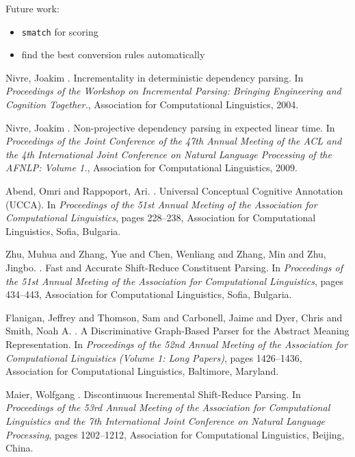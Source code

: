 \documentclass[11pt]{article}
\begin{document}
Future work:
\begin{itemize}
\item \texttt{smatch} for scoring
\item find the best conversion rules automatically
\end{itemize}

\begin{thebibliography}{}
	
	Nivre, Joakim
	.
	\newblock Incrementality in deterministic dependency parsing.
	\newblock In {\em Proceedings of the Workshop on Incremental Parsing: Bringing Engineering and Cognition Together.}, Association for Computational Linguistics, 2004.
		
	Nivre, Joakim
	.
	\newblock Non-projective dependency parsing in expected linear time.
	\newblock In {\em Proceedings of the Joint Conference of the 47th Annual Meeting of the ACL and the 4th International Joint Conference on Natural Language Processing of the AFNLP: Volume 1.}, Association for Computational Linguistics, 2009.
	
	Abend, Omri  and  Rappoport, Ari.
	.
	\newblock Universal Conceptual Cognitive Annotation (UCCA).
	\newblock In {\em Proceedings of the 51st Annual Meeting of the Association for Computational Linguistics}, pages 228--238, Association for Computational Linguistics, Sofia, Bulgaria.
	
	Zhu, Muhua  and  Zhang, Yue  and  Chen, Wenliang  and  Zhang, Min  and  Zhu, Jingbo.
	.
	\newblock Fast and Accurate Shift-Reduce Constituent Parsing.
	\newblock In {\em Proceedings of the 51st Annual Meeting of the Association for Computational Linguistics}, pages 434--443, Association for Computational Linguistics, Sofia, Bulgaria.
	
	Flanigan, Jeffrey  and  Thomson, Sam  and  Carbonell, Jaime  and  Dyer, Chris  and  Smith, Noah A.
	.
	\newblock A Discriminative Graph-Based Parser for the Abstract Meaning Representation.
	\newblock In {\em Proceedings of the 52nd Annual Meeting of the Association for Computational Linguistics (Volume 1: Long Papers)}, pages 1426--1436, Association for Computational Linguistics, Baltimore, Maryland.
		
	Maier, Wolfgang
	.
	\newblock Discontinuous Incremental Shift-Reduce Parsing.
	\newblock In {\em Proceedings of the 53rd Annual Meeting of the Association for Computational Linguistics and the 7th International Joint Conference on Natural Language Processing}, pages 1202--1212, Association for Computational Linguistics, Beijing, China.
	

\end{thebibliography}
\end{document}
